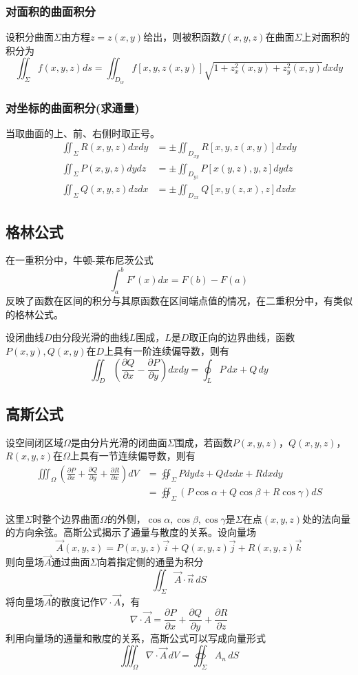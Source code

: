 \subsubsection{对面积的曲面积分}
设积分曲面$\Sigma$由方程$z=z(x,y)$给出，则被积函数$f(x,y,z)$在曲面$\Sigma$上对面积的积分为
\[\iint_{\Sigma} f(x, y, z) d s=\iint_{D_{w}} f[x, y, z(x, y)] \sqrt{1+z_{x}^{2}(x, y)+z_{y}^{2}(x, y)} d x d y\]
\subsubsection[对坐标的曲面积分]{对坐标的曲面积分(求通量)}
当取曲面的上、前、右侧时取正号。
\begin{align*}
    \iint_{\Sigma} R(x, y, z) d x d y &=\pm \iint_{D_{xy}} R[x, y, z(x, y)] d x d y \\ 
    \iint_{\Sigma} P(x, y, z) d y d z &=\pm \iint_{D_{yz}} P[x(y, z), y, z] d y d z \\ 
    \iint_{\Sigma} Q(x, y, z) d z d x &=\pm \iint_{D_{zx}} Q[x, y(z, x), z] d z d x
\end{align*}
\subsection{格林公式}
在一重积分中，牛顿-莱布尼茨公式
\[\int_a^b F'(x)dx=F(b)-F(a)\]
反映了函数在区间的积分与其原函数在区间端点值的情况，在二重积分中，有类似的格林公式。

设闭曲线$D$由分段光滑的曲线$L$围成，$L$是$D$取正向的边界曲线，函数$P(x,y),Q(x,y)$在$D$上具有一阶连续偏导数，则有
\[\iint_D\left(\frac{\partial Q}{\partial x}-\frac{\partial P}{\partial y}\right)dxdy=\oint_LP\,dx+Q\,dy\]
\subsection{高斯公式}
设空间闭区域$\Omega$是由分片光滑的闭曲面$\Sigma$围成，若函数$P(x,y,z)$，$Q(x,y,z)$，$R(x,y,z)$在$\Omega$上具有一节连续偏导数，则有
\begin{align*}
    \iiint_\Omega\left(\frac{\partial P}{\partial x}+\frac{\partial Q}{\partial y}+\frac{\partial R}{\partial x}\right)dV &=\oiint_\Sigma Pdydz+Qdzdx+Rdxdy\\
    &=\oiint_\Sigma \left(P\cos\alpha+Q\cos\beta+R\cos\gamma\right)dS
\end{align*}

这里$\Sigma$时整个边界曲面$\Omega$的外侧，$\cos\alpha,\cos\beta,\cos\gamma$是$\Sigma$在点$(x,y,z)$处的法向量的方向余弦。高斯公式揭示了通量与散度的关系。设向量场
\[\vec{A}(x,y,z)=P(x,y,z)\vec{i}+Q(x,y,z)\vec{j}+R(x,y,z)\vec{k}\]
则向量场$\vec{A}$通过曲面$\Sigma$向着指定侧的通量为积分
\[\iint_\Sigma\vec{A}\cdot\vec{n}\,dS\]
将向量场$\vec{A}$的散度记作$\nabla\cdot \vec{A}$，有
\[\nabla\cdot\vec{A}=\frac{\partial P}{\partial x}+\frac{\partial Q}{\partial y}+\frac{\partial R}{\partial z}\]
利用向量场的通量和散度的关系，高斯公式可以写成向量形式
\[\iiint_\Omega\nabla\cdot\vec{A}\,dV=\oiint_\Sigma A_n\,dS\]

